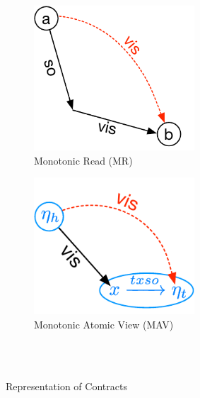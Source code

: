 \begin{figure}
    \centering
    \begin{subfigure}[b]{0.3\textwidth}
        \includegraphics[width=0.66\textwidth]{Figures/MR.pdf}
        \caption{Monotonic Read (MR)}
    \end{subfigure} 
    \hspace{10 mm}
    \begin{subfigure}[b]{0.3\textwidth}
        \centering
        \includegraphics[width=0.66\textwidth]{Figures/MAV.pdf}
        \caption{Monotonic Atomic View (MAV)}
    \end{subfigure}
    \\ \hrulefill \\
    \caption{Representation of Contracts}
\end{figure}
